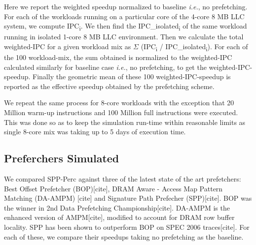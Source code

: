 \documentclass{sig-alternate}
\begin{document}
Here we report the weighted speedup normalized to baseline \textit{i.e.}, no prefetching. 
For each of the workloads running on a particular core of the 4-core 8 MB LLC system, we compute IPC\textsubscript{i}. 
We then find the IPC\_isolated\textsubscript{i} of the same workload running in isolated 1-core 8 MB LLC environment. 
Then we calculate the total weighted-IPC for a given workload mix as $\Sigma$ (IPC\textsubscript{i} / IPC\_isolated\textsubscript{i}). 
For each of the 100 workload-mix, the sum obtained is normalized to the weighted-IPC calculated similarly for baseline case \textit{i.e.}, no prefetching, to get the weighted-IPC-speedup. 
Finally the geometric mean of these 100 weighted-IPC-speedup is reported as the effective speedup obtained by the prefetching scheme.

We repeat the same process for 8-core workloads with the exception that 20 Million warm-up instructions and 100 Million full instructions were executed.
This was done so as to keep the simulation run-time within reasonable limits as single 8-core mix was taking up to 5 days of execution time.

\subsection{Preferchers Simulated}
We compared SPP-Perc against three of the latest state of the art prefetchers: Best Offset Prefetcher (BOP)[cite], DRAM Aware - Access Map Pattern Matching (DA-AMPM) [cite] and Signature Path Prefecher (SPP)[cite]. 
BOP was the winner in 2nd Data Prefetching Championship[cite]. 
DA-AMPM is the enhanced version of AMPM[cite], modified to account for DRAM row buffer locality. 
SPP has been shown to outperform BOP on SPEC 2006 traces[cite]. 
For each of these, we compare their speedups taking no prefetching as the baseline.
\end{document}

